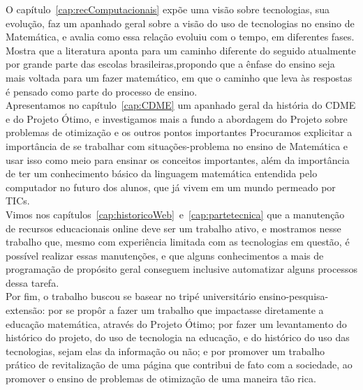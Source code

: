 
O capítulo~\ref{cap:recComputacionais} expõe uma visão sobre tecnologias, sua evolução, faz um apanhado geral sobre a visão do uso de tecnologias no ensino de Matemática, e avalia como essa relação evoluiu com o tempo, em diferentes fases. Mostra que a literatura aponta para um caminho diferente do seguido atualmente por grande parte das escolas brasileiras,propondo que a ênfase do ensino seja mais voltada para um fazer matemático, em que o caminho que leva às respostas é pensado como parte do processo de ensino.
\\

Apresentamos no capítulo~\ref{cap:CDME} um apanhado geral da história do CDME e do Projeto Ótimo, e investigamos mais a fundo a abordagem do Projeto sobre problemas de otimização e os outros pontos importantes Procuramos explicitar a importância de se trabalhar com situações-problema no ensino de Matemática e usar isso como meio para ensinar os conceitos importantes, além da importância de ter um conhecimento básico da linguagem matemática entendida pelo computador no futuro dos alunos, que já vivem em um mundo permeado por TICs.
\\

Vimos nos capítulos~\ref{cap:historicoWeb}~e~\ref{cap:partetecnica} que a manutenção de recursos educacionais online deve ser um trabalho ativo, e mostramos nesse trabalho que, mesmo com experiência limitada com as tecnologias em questão, é possível realizar essas manutenções, e que alguns conhecimentos a mais de programação de propósito geral conseguem inclusive automatizar alguns processos dessa tarefa.
\\

Por fim, o trabalho buscou se basear no tripé universitário ensino-pesquisa-extensão: por se propôr a fazer um trabalho que impactasse diretamente a educação matemática, através do Projeto Ótimo; por fazer um levantamento do histórico do projeto, do uso de tecnologia na educação, e do histórico do uso das tecnologias, sejam elas da informação ou não; e por promover um trabalho prático de revitalização de uma página que contribui de fato com a sociedade, ao promover o ensino de problemas de otimização de uma maneira tão rica.


